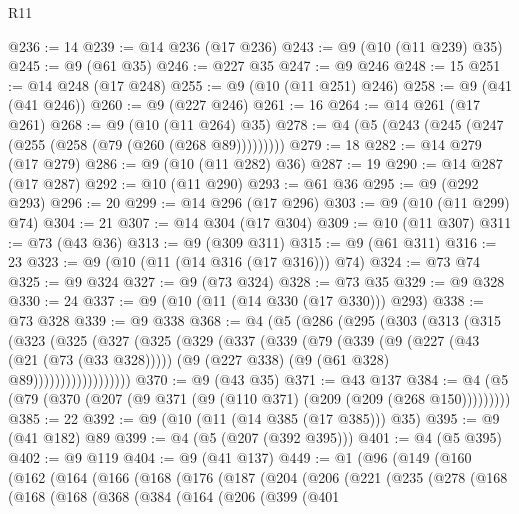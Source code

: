 \begin{lexlean}{R11}
\begin{coremodule}
@236 := 14
@239 := @14 @236 (@17 @236)
@243 := @9 (@10 (@11 @239) @35)
@245 := @9 (@61 @35)
@246 := @227 @35
@247 := @9 @246
@248 := 15
@251 := @14 @248 (@17 @248)
@255 := @9 (@10 (@11 @251) @246)
@258 := @9 (@41 (@41 @246))
@260 := @9 (@227 @246)
@261 := 16
@264 := @14 @261 (@17 @261)
@268 := @9 (@10 (@11 @264) @35)
@278 := @4 (@5 (@243 (@245 (@247 (@255 (@258 (@79 (@260 (@268 @89)))))))))
@279 := 18
@282 := @14 @279 (@17 @279)
@286 := @9 (@10 (@11 @282) @36)
@287 := 19
@290 := @14 @287 (@17 @287)
@292 := @10 (@11 @290)
@293 := @61 @36
@295 := @9 (@292 @293)
@296 := 20
@299 := @14 @296 (@17 @296)
@303 := @9 (@10 (@11 @299) @74)
@304 := 21
@307 := @14 @304 (@17 @304)
@309 := @10 (@11 @307)
@311 := @73 (@43 @36)
@313 := @9 (@309 @311)
@315 := @9 (@61 @311)
@316 := 23
@323 := @9 (@10 (@11 (@14 @316 (@17 @316))) @74)
@324 := @73 @74
@325 := @9 @324
@327 := @9 (@73 @324)
@328 := @73 @35
@329 := @9 @328
@330 := 24
@337 := @9 (@10 (@11 (@14 @330 (@17 @330))) @293)
@338 := @73 @328
@339 := @9 @338
@368 := @4
    (@5
      (@286
        (@295
          (@303
            (@313
              (@315
                (@323
                  (@325
                    (@327
                      (@325
                        (@329
                          (@337
                            (@339
                              (@79
                                (@339
                                  (@9
                                    (@227 (@43 (@21 (@73 (@33 @328)))))
                                    (@9 (@227 @338) (@9 (@61 @328) @89))))))))))))))))))
@370 := @9 (@43 @35)
@371 := @43 @137
@384 := @4 (@5 (@79 (@370 (@207 (@9 @371 (@9 (@110 @371) (@209 (@209 (@268 @150)))))))))
@385 := 22
@392 := @9 (@10 (@11 (@14 @385 (@17 @385))) @35)
@395 := @9 (@41 @182) @89
@399 := @4 (@5 (@207 (@392 @395)))
@401 := @4 (@5 @395)
@402 := @9 @119
@404 := @9 (@41 @137)
@449 := @1
    (@96
      (@149
        (@160
          (@162
            (@164
              (@166
                (@168
                  (@176
                    (@187
                      (@204
                        (@206
                          (@221
                            (@235
                              (@278
                                (@168
                                  (@168
                                    (@168
                                      (@368
                                        (@384
                                          (@164
                                            (@206
                                              (@399
                                                (@401

\end{coremodule}
\end{lexlean}
